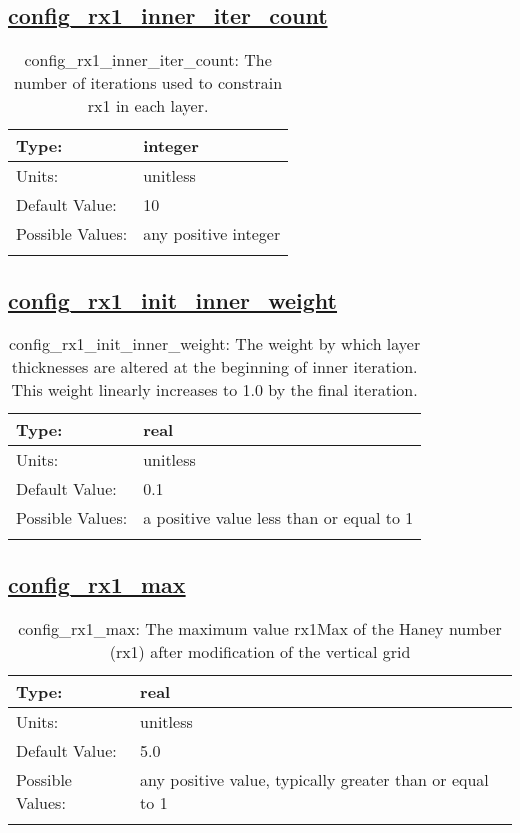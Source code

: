 \subsection[config\_rx1\_inner\_iter\_count]{\hyperref[sec:nm_tab_constrain_Haney_number]{config\_rx1\_inner\_iter\_count}}
\label{subsec:nm_sec_config_rx1_inner_iter_count}
\begin{center}
\begin{longtable}{| p{2.0in} || p{4.0in} |}
    \hline
    Type: & integer \\
    \hline
    Units: & \si{unitless} \\
    \hline
    Default Value: & 10 \\
    \hline
    Possible Values: & any positive integer \\
    \hline
    \caption{config\_rx1\_inner\_iter\_count: The number of iterations used to constrain rx1 in each layer.}
\end{longtable}
\end{center}
\subsection[config\_rx1\_init\_inner\_weight]{\hyperref[sec:nm_tab_constrain_Haney_number]{config\_rx1\_init\_inner\_weight}}
\label{subsec:nm_sec_config_rx1_init_inner_weight}
\begin{center}
\begin{longtable}{| p{2.0in} || p{4.0in} |}
    \hline
    Type: & real \\
    \hline
    Units: & \si{unitless} \\
    \hline
    Default Value: & 0.1 \\
    \hline
    Possible Values: & a positive value less than or equal to 1 \\
    \hline
    \caption{config\_rx1\_init\_inner\_weight: The weight by which layer thicknesses are altered at the beginning of inner iteration. This weight linearly increases to 1.0 by the final iteration.}
\end{longtable}
\end{center}
\subsection[config\_rx1\_max]{\hyperref[sec:nm_tab_constrain_Haney_number]{config\_rx1\_max}}
\label{subsec:nm_sec_config_rx1_max}
\begin{center}
\begin{longtable}{| p{2.0in} || p{4.0in} |}
    \hline
    Type: & real \\
    \hline
    Units: & \si{unitless} \\
    \hline
    Default Value: & 5.0 \\
    \hline
    Possible Values: & any positive value, typically greater than or equal to 1 \\
    \hline
    \caption{config\_rx1\_max: The maximum value rx1Max of the Haney number (rx1) after modification of the vertical grid}
\end{longtable}
\end{center}
